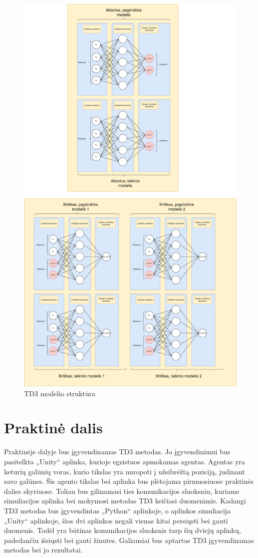 \documentclass[a4paper, 12pt]{article}
\begin{document}
\newpage
\begin{figure}[h!]
\centering
\includegraphics[width=.7\textwidth]{TD3}
\caption{TD3 modelio struktūra}
\label{TD3Struktura}
\end{figure}

\newpage

\section{Praktinė dalis}

Praktinėje dalyje bus įgyvendinamas TD3 metodas. Jo įgyvendinimui bus pasitelkta „Unity“ aplinka, kurioje egzistuos apmokamas agentas. Agentas yra keturių galūnių voras, kurio tikslas yra nuropoti į užsibrėžtą poziciją, judinant savo galūnes. Šis agento tikslas bei aplinka bus plėtojama pirmuosiuose praktinės dalies skyriuose. Toliau bus gilinamasi ties komunikacijos sluoksniu, kuriame simuliacijos aplinka bei mokymosi metodas TD3 keičiasi duomenimis. Kadangi TD3 metodas bus įgyvendintas „Python“ aplinkoje, o aplinkos simuliacija „Unity“ aplinkoje, šios dvi aplinkos negali vienas kitai persiųsti bei gauti duomenis. Todėl yra būtinas komunikacijos sluoksnis tarp šių dviejų aplinkų, padedančiu išsiųsti bei gauti žinutes. Galiausiai bus aptartas TD3 įgyvendinamas metodas bei jo rezultatai.
\end{document}
